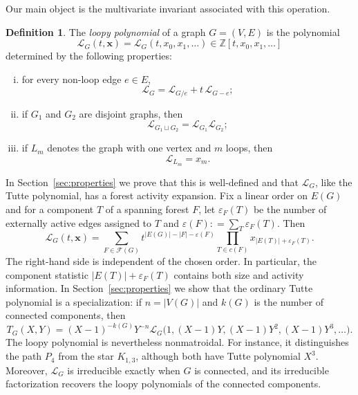 \documentclass[11pt]{article}
\theoremstyle{plain}
\theoremstyle{definition}
\newtheorem{definition}[theorem]{Definition}
\renewcommand{\mathcal}{\mathscr}
\newcommand{\ds}{\displaystyle}
\newcommand{\LL}{\mathcal{L}}    %
\newcommand{\cF}{\mathcal{F}}    %
\newcommand{\bx}{\mathbf{x}}
\newcommand{\eps}{\varepsilon}
\newcommand{\ZZ}{\mathbb Z}
\numberwithin{equation}{section}
\begin{document}
Our main object is the multivariate invariant associated with this operation.

\begin{definition}\label{def:main}
The \emph{loopy polynomial} of a graph $G=(V,E)$ is the polynomial
\[
   \LL_G(t,\bx)=\LL_G(t,x_0,x_1,\ldots)
   \in\ZZ[t,x_0,x_1,\ldots]
\]
determined by the following properties:
\begin{enumerate}[(i)]
\item for every non-loop edge $e\in E$,
\begin{equation}\label{eq:loopy}
   \LL_G=\LL_{G/e}+t\,\LL_{G-e};
\end{equation}
\item if $G_1$ and $G_2$ are disjoint graphs, then
\[
   \LL_{G_1\sqcup G_2}=\LL_{G_1}\LL_{G_2};
\]
\item if $L_m$ denotes the graph with one vertex and $m$ loops, then
\begin{equation}\label{eq:init}
   \LL_{L_m}=x_m.
\end{equation}
\end{enumerate}
\end{definition}
In Section~\ref{sec:properties} we prove that this is well-defined and that $\LL_G$,
like the Tutte polynomial,  has a forest activity expansion.
Fix a linear order on $E(G)$ and for a component $T$ of a spanning forest $F$,
let $\eps_F(T)$ be the number of externally active
edges assigned to $T$ and $\ds \eps(F): = \sum_T\eps_F(T)$.  Then
\begin{equation}\label{eq:forest-intro}
   \LL_G(t,\bx)  =  \sum_{F\in\cF(G)}
t^{|E(G)|-|F|-\eps(F)}\prod_{T\in c(F)} x_{|E(T)|+\eps_F(T)}.
\end{equation}
The right-hand side is independent of the chosen order.  In particular, the component statistic
$ |E(T)|+\eps_F(T) $ contains both size and activity information.
In Section~\ref{sec:properties} we show that the ordinary Tutte polynomial
is a specialization: if $n=|V(G)|$ and $k(G)$ is the number of connected components, then
\begin{equation}\label{eq:tutte-from-L-intro}
T_G(X,Y) = (X-1)^{-k(G)}Y^{-n} \LL_G\bigl(1,(X-1)Y,(X-1)Y^2,(X-1)Y^3,\ldots\bigr).
\end{equation}
The loopy polynomial is nevertheless nonmatroidal.
For instance, it distinguishes the path $P_4$ from the star $K_{1,3}$, although both have Tutte polynomial $X^3$.
Moreover, $\LL_G$ is irreducible exactly when $G$ is connected,
and its irreducible factorization recovers the loopy polynomials of the connected components.
\end{document}
